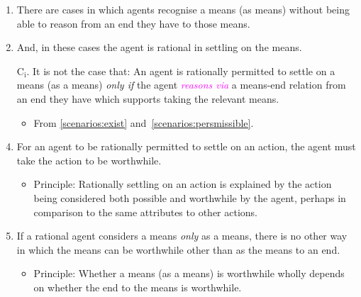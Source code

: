 \documentclass[10pt]{article}
\begin{document}
\begin{enumerate}[label=\arabic*., ref=(\arabic*)]

\item\label{scenarios:exist} There are cases in which agents recognise a means (as means) without being able to reason from an end they have to those means.

\item\label{scenarios:persmissible} And, in these cases the agent is rational in settling on the means.

\item[C\(_{\text{i}}\).]\label{scenario:no-reasoning} It is not the case that:
  An agent is rationally permitted to settle on a means (as a means)  \emph{only if} the agent \textcolor{fuchsia}{\emph{reasons via}} a means-end relation from an end they have which supports taking the relevant means.

  \begin{itemize}
  \item From \ref{scenarios:exist} and~\ref{scenarios:persmissible}.
  \end{itemize}

\item\label{settle:worthwhile} For an agent to be rationally permitted to settle on an action, the agent must take the action to be worthwhile.

  \begin{itemize}
  \item Principle: Rationally settling on an action is explained by the action being considered both possible and worthwhile by the agent, perhaps in comparison to the same attributes to other actions.
  \end{itemize}

\item\label{m-e:dependence} If a rational agent considers a means \emph{only} as a means, there is no other way in which the means can be worthwhile other than as the means to an end.

  \begin{itemize}
  \item Principle: Whether a means (as a means) is worthwhile wholly depends on whether the end to the means is worthwhile.
  \end{itemize}


\end{enumerate}
\end{document}
